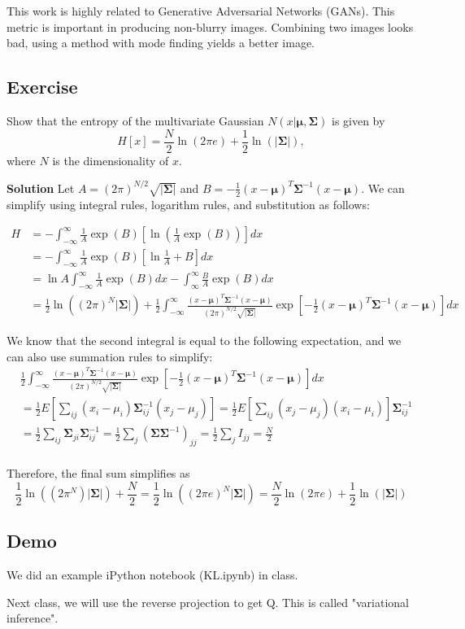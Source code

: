 \documentclass{article}
\begin{document}
\smallskip
This work is highly related to Generative Adversarial Networks (GANs). This metric is important in producing non-blurry images. Combining two images looks bad, using a method with mode finding yields a better image.

\subsection{Exercise}
Show that the entropy of the multivariate Gaussian $N(x|\bm{\mu},\bm{\Sigma})$ is given by
$$H[x] =  \frac{N}{2} \ln(2 \pi e) + \frac{1}{2}\ln(|\bm{\Sigma}|), $$
where $N$ is the dimensionality of $x$.


\textbf{Solution}
Let $A = (2 \pi)^{N/2} \sqrt{|\bm{\Sigma}|}$ and $B = -\frac{1}{2}(x-\bm{\mu})^T \bm{\Sigma}^{-1} (x-\bm{\mu})$.
We can simplify using integral rules, logarithm rules, and substitution as follows:

\begin{align*}
  H &= -\int_{-\infty}^{\infty} \frac{1}{A} \exp(B)\left[\ln \left(\frac{1}{A} \exp(B)\right)\right] dx \\
  &= -\int_{-\infty}^{\infty} \frac{1}{A} \exp(B)\left[\ln \frac{1}{A} +B\right] dx \\
  &= \ln A \int_{-\infty}^{\infty} \frac{1}{A} \exp(B) dx - \int_{\infty}^{\infty} \frac{B}{A} \exp(B) dx \\
  &= \frac{1}{2} \ln ((2\pi)^N |\bm{\Sigma}|) + \frac{1}{2} \int_{-\infty}^{\infty} \frac{(x-\bm{\mu})^T \bm{\Sigma}^{-1} (x-\bm{\mu})}{(2\pi)^{N/2} \sqrt{|\bm{\Sigma}|}} \exp\left[-\frac{1}{2}(x-\bm{\mu})^T\bm{\Sigma}^{-1}(x-\bm{\mu})\right] dx 
\end{align*}

We know that the second integral is equal to the following expectation, and we can also use summation rules to simplify:
\begin{align*}
    &\frac{1}{2} \int_{-\infty}^{\infty} \frac{(x-\bm{\mu})^T \bm{\Sigma}^{-1} (x-\bm{\mu})}{(2\pi)^{N/2} \sqrt{|\bm{\Sigma}|}} \exp\left[-\frac{1}{2}(x-\bm{\mu})^T\bm{\Sigma}^{-1}(x-\bm{\mu})\right] dx \\
    &= \frac{1}{2}E\left[\sum_{ij} (x_i - \mu_i) \bm{\Sigma}^{-1}_{ij} (x_j - \mu_j)\right] = \frac{1}{2}E\left[\sum_{ij} (x_j - \mu_j) (x_i - \mu_i) \right] \bm{\Sigma}^{-1}_{ij} \\
    &= \frac{1}{2} \sum_{ij} \bm{\Sigma}_{ji} \bm{\Sigma}^{-1}_{ij} = \frac{1}{2} \sum_j (\bm{\Sigma} \bm{\Sigma}^{-1})_{jj} = \frac{1}{2} \sum_j I_{jj} = \frac{N}{2} \\ 
\end{align*}

Therefore, the final sum simplifies as
$$\frac{1}{2} \ln((2\pi^N) |\bm{\Sigma}|) + \frac{N}{2} = \frac{1}{2} \ln((2 \pi e)^N |\bm{\Sigma}|)  = \frac{N}{2} \ln(2 \pi e) + \frac{1}{2}\ln(|\bm{\Sigma}|)$$

\subsection{Demo}

\smallskip
We did an example iPython notebook (KL.ipynb) in class.

\smallskip
Next class, we will use the reverse projection to get Q. This is called "variational inference".
\end{document}
